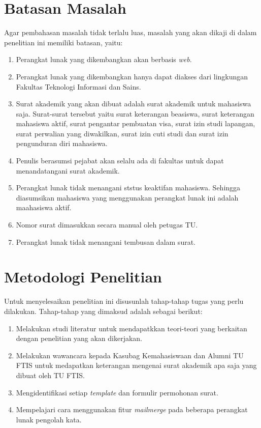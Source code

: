 \section{Batasan Masalah}
\label{sec:batasan_masalah}
Agar pembahasan masalah tidak terlalu luas, masalah yang akan dikaji di dalam penelitian ini memiliki batasan, yaitu:
\begin{enumerate}
	\item Perangkat lunak yang dikembangkan akan berbasis \textit{web}.
	\item Perangkat lunak yang dikembangkan hanya dapat diakses dari lingkungan Fakultas Teknologi Informasi dan Sains.
	\item Surat akademik yang akan dibuat adalah surat akademik untuk mahasiswa saja. Surat-surat tersebut yaitu surat keterangan beasiswa, surat keterangan mahasiswa aktif, surat pengantar pembuatan visa, surat izin studi lapangan, surat perwalian yang diwakilkan, surat izin cuti studi dan surat izin pengunduran diri mahasiswa.
	\item Penulis berasumsi pejabat akan selalu ada di fakultas untuk dapat menandatangani surat akademik.
	\item Perangkat lunak tidak menangani ststus keaktifan mahasiswa. Sehingga diasumsikan mahasiswa yang menggunakan perangkat lunak ini adalah maahasiswa aktif.
	\item Nomor surat dimasukkan secara manual oleh petugas TU.
	\item Perangkat lunak tidak menangani tembusan dalam surat.
\end{enumerate}

\section{Metodologi Penelitian}
\label{sec:metodologi_penelitian}
Untuk menyelesaikan penelitian ini disusunlah tahap-tahap tugas yang perlu dilakukan. Tahap-tahap yang dimaksud adalah sebagai berikut:
\begin{enumerate}
	\item Melakukan studi literatur untuk mendapatkkan teori-teori yang berkaitan dengan penelitian yang akan dikerjakan.
	\item Melakukan wawancara kepada Kasubag Kemahasiswaan dan Alumni TU FTIS untuk medapatkan keterangan mengenai surat akademik apa saja yang dibuat oleh TU FTIS.
	\item Mengidentifikasi setiap \textit{template} dan formulir permohonan surat.
	\item Mempelajari cara menggunakan fitur \textit{mailmerge} pada beberapa perangkat lunak pengolah kata.
\end{enumerate}

